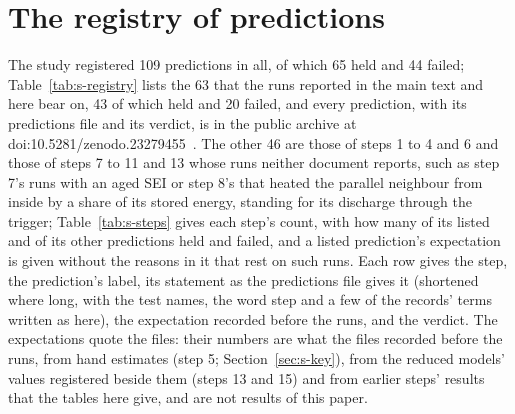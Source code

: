 \documentclass[preprint,12pt]{elsarticle}
\begin{document}
\section{The registry of predictions}
\label{sec:s-registry}

The study registered 109 predictions in all, of which 65 held and 44 failed; Table~\ref{tab:s-registry} lists the 63 that the runs reported in the main text and here bear on, 43 of which held and 20 failed, and every prediction, with its predictions file and its verdict, is in the public archive at doi:10.5281/zenodo.23279455~\cite{satte2026repo}. The other 46 are those of steps 1 to 4 and 6 and those of steps 7 to 11 and 13 whose runs neither document reports, such as step 7's runs with an aged SEI or step 8's that heated the parallel neighbour from inside by a share of its stored energy, standing for its discharge through the trigger; Table~\ref{tab:s-steps} gives each step's count, with how many of its listed and of its other predictions held and failed, and a listed prediction's expectation is given without the reasons in it that rest on such runs. Each row gives the step, the prediction's label, its statement as the predictions file gives it (shortened where long, with the test names, the word step and a few of the records' terms written as here), the expectation recorded before the runs, and the verdict. The expectations quote the files: their numbers are what the files recorded before the runs, from hand estimates (step 5; Section~\ref{sec:s-key}), from the reduced models' values registered beside them (steps 13 and 15) and from earlier steps' results that the tables here give, and are not results of this paper.
\end{document}
